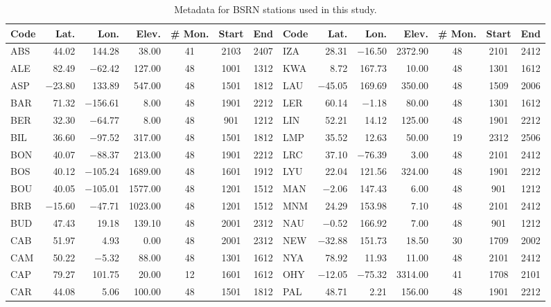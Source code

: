 \begin{table}[ht]
\centering
\caption{Metadata for BSRN stations used in this study.} 
\label{tab:metadata}
\begin{tabular}{lrrrccclrrrccc}
  \toprule
Code & Lat. & Lon. & Elev. & \# Mon. & Start & End & Code & Lat. & Lon. & Elev. & \# Mon. & Start & End \\ 
  \midrule
ABS & 44.02 & 144.28 & 38.00 &  41 & 2103 & 2407 & IZA & 28.31 & $-$16.50 & 2372.90 &  48 & 2101 & 2412 \\ 
  ALE & 82.49 & $-$62.42 & 127.00 &  48 & 1001 & 1312 & KWA & 8.72 & 167.73 & 10.00 &  48 & 1301 & 1612 \\ 
  ASP & $-$23.80 & 133.89 & 547.00 &  48 & 1501 & 1812 & LAU & $-$45.05 & 169.69 & 350.00 &  48 & 1509 & 2006 \\ 
  BAR & 71.32 & $-$156.61 & 8.00 &  48 & 1901 & 2212 & LER & 60.14 & $-$1.18 & 80.00 &  48 & 1301 & 1612 \\ 
  BER & 32.30 & $-$64.77 & 8.00 &  48 & 901 & 1212 & LIN & 52.21 & 14.12 & 125.00 &  48 & 1901 & 2212 \\ 
  BIL & 36.60 & $-$97.52 & 317.00 &  48 & 1501 & 1812 & LMP & 35.52 & 12.63 & 50.00 &  19 & 2312 & 2506 \\ 
  BON & 40.07 & $-$88.37 & 213.00 &  48 & 1901 & 2212 & LRC & 37.10 & $-$76.39 & 3.00 &  48 & 2101 & 2412 \\ 
  BOS & 40.12 & $-$105.24 & 1689.00 &  48 & 1601 & 1912 & LYU & 22.04 & 121.56 & 324.00 &  48 & 1901 & 2212 \\ 
  BOU & 40.05 & $-$105.01 & 1577.00 &  48 & 1201 & 1512 & MAN & $-$2.06 & 147.43 & 6.00 &  48 & 901 & 1212 \\ 
  BRB & $-$15.60 & $-$47.71 & 1023.00 &  48 & 1201 & 1512 & MNM & 24.29 & 153.98 & 7.10 &  48 & 2101 & 2412 \\ 
  BUD & 47.43 & 19.18 & 139.10 &  48 & 2001 & 2312 & NAU & $-$0.52 & 166.92 & 7.00 &  48 & 901 & 1212 \\ 
  CAB & 51.97 & 4.93 & 0.00 &  48 & 2001 & 2312 & NEW & $-$32.88 & 151.73 & 18.50 &  30 & 1709 & 2002 \\ 
  CAM & 50.22 & $-$5.32 & 88.00 &  48 & 1301 & 1612 & NYA & 78.92 & 11.93 & 11.00 &  48 & 2101 & 2412 \\ 
  CAP & 79.27 & 101.75 & 20.00 &  12 & 1601 & 1612 & OHY & $-$12.05 & $-$75.32 & 3314.00 &  41 & 1708 & 2101 \\ 
  CAR & 44.08 & 5.06 & 100.00 &  48 & 1501 & 1812 & PAL & 48.71 & 2.21 & 156.00 &  48 & 1901 & 2212 \\ 

\end{tabular}
\end{table}
